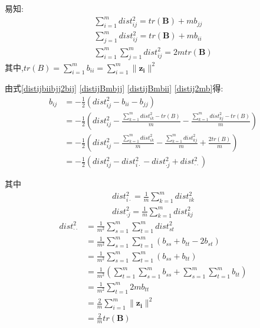 \documentclass[UTF8,a4paper]{ctexart}%
\begin{document}
              易知:
              \begin{align}
                  \sum_{i = 1}^m dist_{ij}^2 = tr(\mathbf{B}) + mb_{jj} \label{distijBmbjj}\\
                  \sum_{j = 1}^m dist_{ij}^2 = tr(\mathbf{B}) + mb_{ii}\label{distijBmbii}\\
                  \sum_{i = 1}^m  \sum_{j = 1}^m dist_{ij}^2 = 2m tr(\mathbf{B})
                  \label{distij2mb}
              \end{align}
              其中,$tr(B) = \sum_{i = 1}^m b_{ii} = \sum_{i = 1}^m \| \mathbf{z_i} \|^2$

              由式\eqref{distijbiibjj2bij} \eqref{distijBmbjj} \eqref{distijBmbii} \eqref{distij2mb}得:
              \begin{align}
                b_{ij} &= -\frac{1}{2} \left ( dist^2_{ij} - b_{ii} - b_{jj} \right ) \\
                &= -\frac{1}{2} \left ( dist^2_{ij} - \frac{\sum_{k = 1}^m dist_{ik}^2  - tr(B)}{m} - \frac{\sum_{k = 1}^m dist_{kj}^2  - tr(B)}{m} \right ) \\
                &= -\frac{1}{2} \left ( dist^2_{ij} - \frac{\sum_{k = 1}^m dist_{ik}^2  }{m} - \frac{\sum_{k = 1}^m dist_{kj}^2}{m} + \frac{2tr(B)}{m} \right )\\
                &= -\frac{1}{2} \left ( dist^2_{ij} - dist^2_{i\cdot} - dist^2_{\cdot j} +  dist_{\cdot \cdot}^2 \right ) \label{bijdijdi*d*jd**}
              \end{align}

              其中
              \begin{align}
                  dist^2_{i\cdot} =  \frac{1}{m}\sum_{k = 1}^m dist_{ik}^2 \label{disti*}\\
                  dist^2_{\cdot j} = \frac{1}{m}\sum_{k = 1}^m dist_{kj}^2\label{dist*j}
              \end{align}
              \begin{equation}
                \label{dist**}
              \begin{split}
                  dist^2_{\cdot \cdot} &=\frac{1}{m^2} \sum_{s = 1}^m \sum_{t = 1}^m dist_{st}^2 \\
                  &= \frac{1}{m^2} \sum_{s = 1}^m \sum_{t = 1}^m (b_{ss} + b_{tt} - 2b_{st})\\
                  &= \frac{1}{m^2} \sum_{s = 1}^m \sum_{t = 1}^m (b_{ss} + b_{tt})\\
                  &= \frac{1}{m^2} \left (   \sum_{t = 1}^m  \sum_{s = 1}^m b_{ss} + \sum_{s = 1}^m \sum_{t = 1}^m b_{tt} \right )\\
                  &= \frac{1}{m^2} \sum_{t = 1}^m 2mb_{tt}\\
                  &= \frac{2}{m} \sum_{i = 1}^m \| \mathbf{z_i} \|^2 \\
                  &= \frac{2}{m} tr(\mathbf{B})
              \end{split}
              \end{equation}
\end{document}
